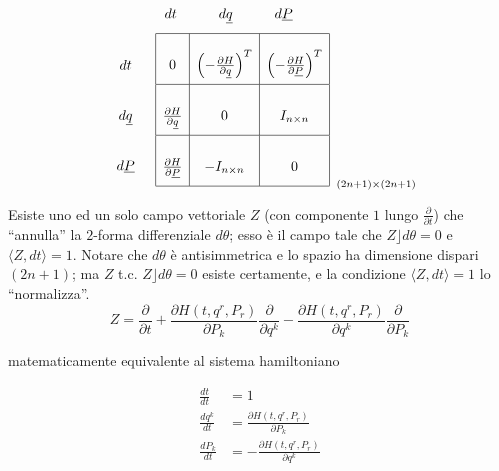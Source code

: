 \begin{equation*}
  \renewcommand\arraystretch{3}
  \begin{array}{c c}
    \qquad &
    \begin{array}{c c c}
      dt \qquad & d \uline{q} \qquad & d \uline{P} \qquad
    \end{array}\\
    \begin{array}{c}
      dt\\
      d \uline{q}\\
      d \uline{P}
    \end{array}&
    \begin{array}{| c | c | c |}
      \hline
      0 & \left( - \frac{\partial H}{\partial \uline{q}} \right)^T & \left( - \frac{\partial H}{\partial \uline{P}} \right)^T\\
      \hline
      \frac{\partial H}{\partial \uline{q}} & 0 & I_{n \times n}\\
      \hline
      \frac{\partial H}{\partial \uline{P}} & - I_{n \times n} & 0\\
      \hline
    \end{array}
  \end{array}_{(2n + 1) \times (2n + 1)}
\end{equation*}

Esiste uno ed un solo campo vettoriale $ Z $ (con componente $ 1 $ lungo $ \frac{\partial}{\partial t} $) che ``annulla'' la $ 2 $-forma differenziale $ d\theta $; esso è il campo tale che $ Z \rfloor d \theta = 0 $ e $ \langle Z, dt \rangle =1 $. Notare che $ d\theta $ è antisimmetrica e lo spazio ha dimensione dispari $ (2n+1) $; ma $ Z $ t.c. $ Z \rfloor d \theta = 0 $ esiste certamente, e la condizione $ \langle Z, dt \rangle = 1 $ lo ``normalizza''.\\

\begin{equation*}
  Z = \frac{\partial}{\partial t} + \frac{\partial H(t,q^r,P_r)}{\partial P_k} \frac{\partial}{\partial q^k} - \frac{\partial H(t,q^r,P_r)}{\partial q^k} \frac{\partial}{\partial P_k}
\end{equation*}

matematicamente equivalente al sistema hamiltoniano

\begin{equation*}
  \begin{split}
    \frac{dt}{dt} &= 1 \\
    \frac{dq^k}{dt} &= \frac{\partial H(t,q^r,P_r)}{\partial P_k} \\
    \frac{dP_k}{dt} &= - \frac{\partial H(t,q^r,P_r)}{\partial q^k} \\
  \end{split}
\end{equation*}

